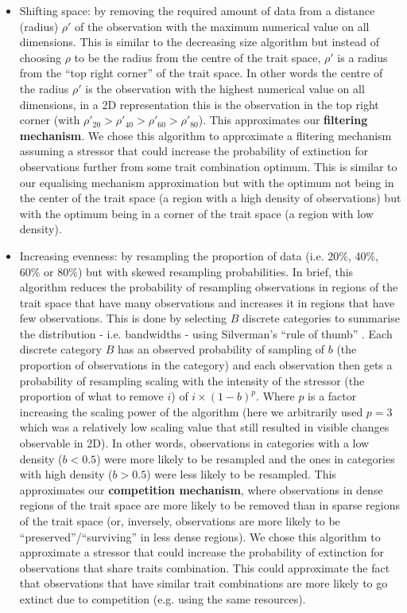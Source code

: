 \documentclass[12pt,letterpaper]{article}
\begin{document}
\begin{itemize}
\item Shifting space: by removing the required amount of data from a distance (radius) $\rho'$ of the observation with the maximum numerical value on all dimensions.
This is similar to the decreasing size algorithm but instead of choosing $\rho$ to be the radius from the centre of the trait space, $\rho'$ is a radius from the ``top right corner'' of the trait space.
In other words the centre of the radius $\rho'$ is the observation with the highest numerical value on all dimensions, in a 2D representation this is the observation in the top right corner (with $\rho'_{20} > \rho'_{40} > \rho'_{60} > \rho'_{80}$).
This approximates our \textbf{filtering mechanism}.
We chose this algorithm to approximate a flitering mechanism assuming a stressor that could increase the probability of extinction for observations further from some trait combination optimum.
This is similar to our equalising mechanism approximation but with the optimum not being in the center of the trait space (a region with a high density of observations) but with the optimum being in a corner of the trait space (a region with low density).

\item Increasing evenness: by resampling the proportion of data (i.e. 20\%, 40\%, 60\% or 80\%) but with skewed resampling probabilities.
In brief, this algorithm reduces the probability of resampling observations in regions of the trait space that have many observations and increases it in regions that have few observations.
This is done by selecting $B$ discrete categories to summarise the distribution - i.e. bandwidths - using Silverman's ``rule of thumb'' \citep[\texttt{bw.nrd0} function in \texttt{R};][]{silverman1986density}.
Each discrete category $B$ has an observed probability of sampling of $b$ (the proportion of observations in the category) and each observation then gets a probability of resampling scaling with the intensity of the stressor (the proportion of what to remove $i$) of $i \times (1-b)^{p}$. 
Where $p$ is a factor increasing the scaling power of the algorithm (here we arbitrarily used $p=3$ which was a relatively low scaling value that still resulted in visible changes observable in 2D).
In other words, observations in categories with a low density ($b<0.5$) were more likely to be resampled and the ones in categories with high density ($b>0.5$) were less likely to be resampled.
This approximates our \textbf{competition mechanism}, where observations in dense regions of the trait space are more likely to be removed than in sparse regions of the trait space (or, inversely, observations are more likely to be ``preserved''/``surviving'' in less dense regions).
We chose this algorithm to approximate a stressor that could increase the probability of extinction for observations that share traits combination.
This could approximate the fact that observations that have similar trait combinations are more likely to go extinct due to competition (e.g. using the same resources). 
\end{itemize}
\end{document}
